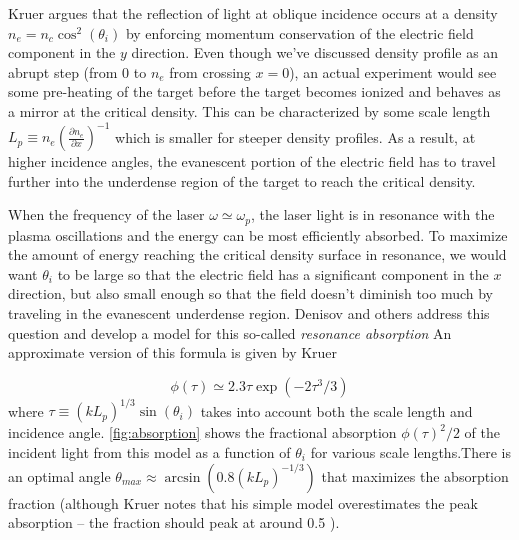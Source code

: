 Kruer \cite{Kruer_2003_Plasma} argues that the reflection of light at oblique incidence occurs at a density $n_e = n_c \cos^2(\theta_i)$ by enforcing momentum conservation of the electric field component in the $y$ direction. Even though we've discussed density profile as an abrupt step (from 0 to $n_e$ from crossing $x = 0$), an actual experiment would see some pre-heating of the target before the target becomes ionized and behaves as a mirror at the critical density. This can be characterized by some scale length $L_p \equiv n_e (\frac{\partial n_e}{\partial x})^{-1}$ which is smaller for steeper density profiles. As a result, at higher incidence angles, the evanescent portion of the electric field has to travel further into the underdense region of the target to reach the critical density. 

When the frequency of the laser $\omega \simeq \omega_p$, the laser light is in resonance with the plasma oscillations and the energy can be most efficiently absorbed. To maximize the amount of energy reaching the critical density surface in resonance, we would want $\theta_i$ to be large so that the electric field has a significant component in the $x$ direction, but also small enough so that the field doesn't diminish too much by traveling in the evanescent underdense region. Denisov \cite{Denisov_1957_JETP} and others \cite{Forslund_1975_PRA, Freidberg_1972_PRL, Estabrook_1975_PoF} address this question and develop a model for this so-called \emph{resonance absorption} An approximate version of this formula is given by Kruer \cite{Kruer_2003_Plasma}

\begin{equation}
	\phi(\tau) \simeq 2.3 \tau \exp(-2 \tau^3 / 3)
\end{equation}
where $\tau \equiv (k L_p)^{1/3} \sin(\theta_i)$ takes into account both the scale length and incidence angle. \cref{fig:absorption} shows the fractional absorption $\phi(\tau)^2/2$ of the incident light from this model as a function of $\theta_i$ for various scale lengths.There is an optimal angle $\theta_{max} \approx \arcsin(0.8 (k L_p)^{-1/3})$ that maximizes the absorption fraction (although Kruer notes that his simple model overestimates the peak absorption -- the  fraction should peak at around 0.5 \cite{Kruer_2003_Plasma}). 


